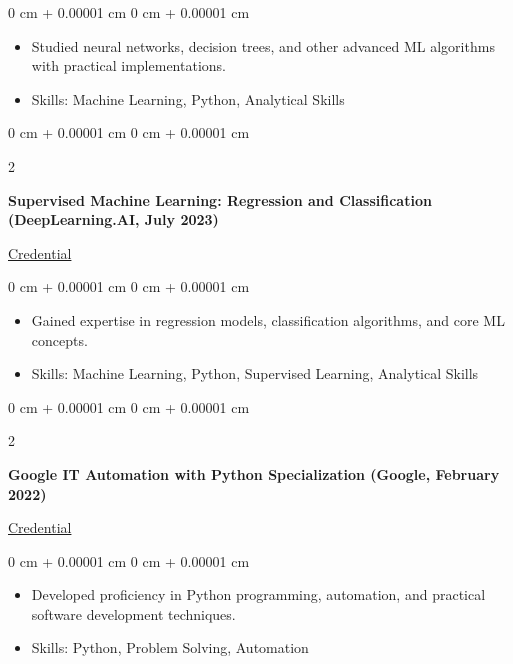 \documentclass[10pt, letterpaper]{article}
\newenvironment{highlights}{
    \begin{itemize}[
        topsep=0.10 cm,
        parsep=0.10 cm,
        partopsep=0pt,
        itemsep=0pt,
        leftmargin=0 cm + 10pt
    ]
}{
    \end{itemize}
} %
\newenvironment{onecolentry}{
    \begin{adjustwidth}{
        0 cm + 0.00001 cm
    }{
        0 cm + 0.00001 cm
    }
}{
    \end{adjustwidth}
} %
\newenvironment{twocolentry}[2][]{
    \onecolentry
    \def\secondColumn{#2}
    \setcolumnwidth{\fill, 4.5 cm}
    \begin{paracol}{2}
}{
    \switchcolumn \raggedleft \secondColumn
    \end{paracol}
    \endonecolentry
} %
\begin{document}
        \begin{onecolentry}
            \begin{highlights}
                \item Studied neural networks, decision trees, and other advanced ML algorithms with practical implementations.
                \item Skills: Machine Learning, Python, Analytical Skills
            \end{highlights}
        \end{onecolentry}
        \vspace{0.2 cm}

        \begin{twocolentry}
            {\href{https://www.coursera.org/account/accomplishments/verify/CFF4985BPNX8}{Credential}}
            \textbf{Supervised Machine Learning: Regression and Classification (DeepLearning.AI, July 2023)}
        \end{twocolentry}
        \vspace{0.10 cm}
        
        \begin{onecolentry}
            \begin{highlights}
                \item Gained expertise in regression models, classification algorithms, and core ML concepts.
                \item Skills: Machine Learning, Python, Supervised Learning, Analytical Skills
            \end{highlights}
        \end{onecolentry}
        \vspace{0.2 cm}

        \begin{twocolentry}
            {\href{https://www.coursera.org/account/accomplishments/specialization/W6VVV4LRX95X}{Credential}}
            \textbf{Google IT Automation with Python Specialization (Google, February 2022)}
        \end{twocolentry}
        \vspace{0.10 cm}
        
        \begin{onecolentry}
            \begin{highlights}
                \item Developed proficiency in Python programming, automation, and practical software development techniques.
                \item Skills: Python, Problem Solving, Automation
            \end{highlights}
        \end{onecolentry}
        
\end{document}
